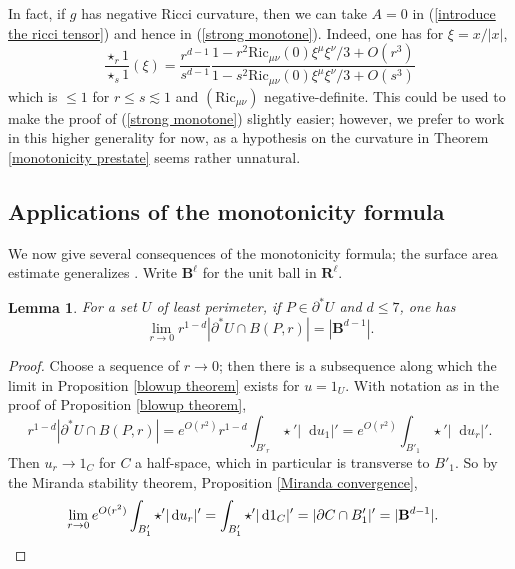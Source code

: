 \documentclass[reqno,12pt,letterpaper]{amsart}
\newcommand{\RR}{\mathbf{R}}
\newcommand{\Ball}{\mathbf{B}}
\newcommand{\Ric}{\mathrm{Ric}}
\newcommand*\dif{\mathop{}\!\mathrm{d}}
\newtheorem{lemma}[theorem]{Lemma}
\theoremstyle{definition}
\numberwithin{equation}{section}
\begin{document}
In fact, if $g$ has negative Ricci curvature, then we can take $A = 0$ in (\ref{introduce the ricci tensor}) and hence in (\ref{strong monotone}). Indeed, one has for $\xi = x/|x|$,
$$\frac{\star_r 1}{\star_s 1}(\xi) = \frac{r^{d - 1}}{s^{d - 1}} \frac{1 - r^2 \Ric_{\mu \nu}(0) \xi^\mu \xi^\nu/3 + O(r^3)}{1 - s^2 \Ric_{\mu \nu}(0) \xi^\mu \xi^\nu/3 + O(s^3)}$$
which is $\leq 1$ for $r \leq s \lesssim 1$ and $(\Ric_{\mu\nu})$ negative-definite.
This could be used to make the proof of (\ref{strong monotone}) slightly easier; however, we prefer to work in this higher generality for now, as a hypothesis on the curvature in Theorem \ref{monotonicity prestate} seems rather unnatural.

\subsection{Applications of the monotonicity formula}
We now give several consequences of the monotonicity formula; the surface area estimate generalizes \cite[Remark 5.13]{Giusti77}.
Write $\Ball^\ell$ for the unit ball in $\RR^\ell$.

\begin{lemma}\label{least perimeter minimal size}
For a set $U$ of least perimeter, if $P \in \partial^* U$ and $d \leq 7$, one has
$$\lim_{r \to 0} r^{1 - d} |\partial^* U \cap B(P, r)| = |\Ball^{d - 1}|.$$
\end{lemma}
\begin{proof}
Choose a sequence of $r \to 0$; then there is a subsequence along which the limit in Proposition \ref{blowup theorem} exists for $u = 1_U$.
With notation as in the proof of Proposition \ref{blowup theorem},
$$r^{1 - d} |\partial^* U \cap B(P, r)| = e^{O(r^2)} r^{1 - d}\int_{B'_r} \star'|\dif u_1|' = e^{O(r^2)} \int_{B'_1} \star'|\dif u_r|'.$$
Then $u_r \to 1_C$ for $C$ a half-space, which in particular is transverse to $B'_1$.
So by the Miranda stability theorem, Proposition \ref{Miranda convergence},
\begin{align*}
\lim_{r \to 0} e^{O(r^2)} \int_{B'_1} \star'|\dif u_r|' &= \int_{B'_1} \star'|\dif 1_C|' = |\partial C \cap B'_1|' = |\Ball^{d - 1}|. \qedhere
\end{align*}
\end{proof}
\end{document}
